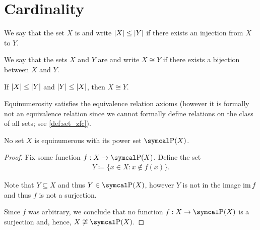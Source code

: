 \section{Cardinality}\label{sec:cardinality}

\begin{definition}\label{def:set_domination}\cite[145]{Enderton1977}
  We say that the set \( X \) is  and write \( \left\vert X \right\vert \leq \left\vert Y \right\vert \) if there exists an injection from \( X \) to \( Y \).
\end{definition}

\begin{definition}\label{def:equinumerous_sets}\cite[129]{Enderton1977}
  We say that the sets \( X \) and \( Y \) are  and write \( X \cong Y \) if there exists a bijection between \( X \) and \( Y \).
\end{definition}

\begin{theorem}\label{thm:cantor_schroder_bernstein}\cite[147]{Enderton1977}
  If \( \left\vert X \right\vert \leq \left\vert Y \right\vert \) and \( \left\vert Y \right\vert \leq \left\vert X \right\vert \), then \( X \cong Y \).
\end{theorem}

\begin{proposition}\label{thm:equinumerousity_equivalence}\cite[theorem 6A]{Enderton1977}
  Equinumerosity satisfies the equivalence relation axioms (however it is formally not an equivalence relation since we cannot formally define relations on the class of all sets; see \cref{def:set_zfc}).
\end{proposition}

\begin{theorem}[Cantor]\label{thm:cantor_power_set_theorem}\cite[theorem 6B]{Enderton1977}
  No set \( X \) is equinumerous with its power set \( \Power(X) \).
\end{theorem}
\begin{proof}
  Fix some function \( f: X \to \Power(X) \). Define the set
  \begin{align*}
    Y \coloneqq \{ x \in X \colon x \not\in f(x) \}.
  \end{align*}

  Note that \( Y \subseteq X \) and thus \( Y \in \Power(X) \), however \( Y \) is not in the image \( \operatorname{im} f \) and thus \( f \) is not a surjection.

  Since \( f \) was arbitrary, we conclude that no function \( f: X \to \Power(X) \) is a surjection and, hence, \( X \not\cong \Power(X) \).
\end{proof}


